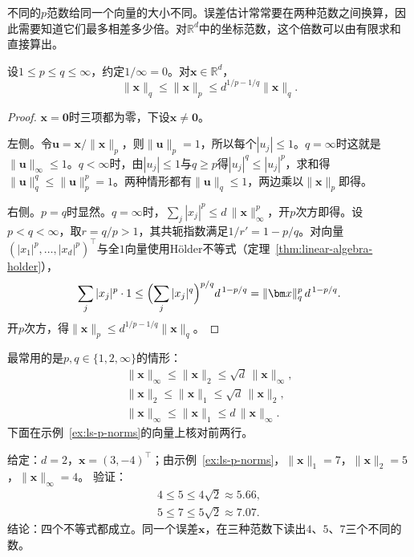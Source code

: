 不同的$p$范数给同一个向量的大小不同。误差估计常常要在两种范数之间换算，因此需要知道它们最多相差多少倍。对$\mathbb R^d$中的坐标范数，这个倍数可以由有限求和直接算出。
\begin{theorem}[坐标范数的比较]
\label{thm:ls-coordinate-norm-comparison}
设$1\leq p\leq q\leq\infty$，约定$1/\infty=0$。对$\bm x\in\mathbb R^d$，
\[
 \lVert\bm x\rVert_q\leq\lVert\bm x\rVert_p\leq d^{1/p-1/q}\lVert\bm x\rVert_q.
\]
\end{theorem}
\begin{proof}
$\bm x=\bm0$时三项都为零，下设$\bm x\neq\bm0$。

左侧。令$\bm u=\bm x/\lVert\bm x\rVert_p$，则$\lVert\bm u\rVert_p=1$，所以每个$|u_j|\leq1$。$q=\infty$时这就是$\lVert\bm u\rVert_\infty\leq1$。$q<\infty$时，由$|u_j|\leq1$与$q\geq p$得$|u_j|^q\leq|u_j|^p$，求和得$\lVert\bm u\rVert_q^q\leq\lVert\bm u\rVert_p^p=1$。两种情形都有$\lVert\bm u\rVert_q\leq1$，两边乘以$\lVert\bm x\rVert_p$即得。

右侧。$p=q$时显然。$q=\infty$时，$\sum_j|x_j|^p\leq d\,\lVert\bm x\rVert_\infty^p$，开$p$次方即得。设$p<q<\infty$，取$r=q/p>1$，其共轭指数满足$1/r'=1-p/q$。对向量$(|x_1|^p,\ldots,|x_d|^p)^\top$与全$1$向量使用Hölder不等式（定理~\ref{thm:linear-algebra-holder}），
\[
 \sum_j|x_j|^p\cdot1\leq\Bigl(\sum_j|x_j|^{q}\Bigr)^{p/q}d^{\,1-p/q}=\lVert\bm x\rVert_q^p\,d^{\,1-p/q}.
\]
开$p$次方，得$\lVert\bm x\rVert_p\leq d^{1/p-1/q}\lVert\bm x\rVert_q$。
\end{proof}
最常用的是$p,q\in\{1,2,\infty\}$的情形：
\[
 \begin{gathered}
 \lVert\bm x\rVert_\infty\leq\lVert\bm x\rVert_2\leq\sqrt d\,\lVert\bm x\rVert_\infty,\\
 \lVert\bm x\rVert_2\leq\lVert\bm x\rVert_1\leq\sqrt d\,\lVert\bm x\rVert_2,\\
 \lVert\bm x\rVert_\infty\leq\lVert\bm x\rVert_1\leq d\,\lVert\bm x\rVert_\infty.
 \end{gathered}
\]
下面在示例~\ref{ex:ls-p-norms}的向量上核对前两行。
\begin{example}[范数比较的数值核对]
\label{ex:ls-norm-comparison-check}
给定：$d=2$，$\bm x=(3,-4)^\top$；由示例~\ref{ex:ls-p-norms}，$\lVert\bm x\rVert_1=7$，$\lVert\bm x\rVert_2=5$，$\lVert\bm x\rVert_\infty=4$。
验证：
\[
 \begin{gathered}
 4\leq5\leq4\sqrt2\approx5.66,\\
 5\leq7\leq5\sqrt2\approx7.07.
 \end{gathered}
\]
结论：四个不等式都成立。同一个误差$\bm x$，在三种范数下读出$4$、$5$、$7$三个不同的数。
\end{example}
